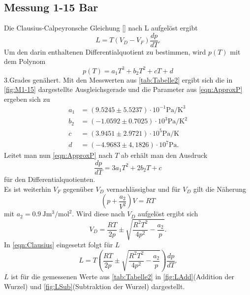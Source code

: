 \subsection{Messung 1-15 Bar}
Die Clausius-Calpeyronsche Gleichung \eqref{} nach L aufgelöst ergibt
\begin{equation}
  \label{eqn:Clausius}
  L = T\left(V_D - V_F\right)\frac{dp}{dT}.
\end{equation}
Um den darin enthaltenen Differentialquotient zu bestimmen, wird $p(T)$ mit dem Polynom
\begin{equation}
  \label{eqn:ApproxP}
  p\left(T\right) = a_1T^3 + b_2T^2 + cT + d
\end{equation}
3.Grades genähert. Mit den Messwerten aus \autoref{tab:Tabelle2} ergibt sich die in \autoref{fig:M1-15} dargestellte Ausgleichsgerade
und die Parameter aus \eqref{eqn:ApproxP} ergeben sich zu
\begin{align*}
  a_1 &= (9.5245\pm 5.5237)\cdot 10^{-1}\unit{\pascal\per\cubic\kelvin} \\
  b_2 &= (-1.0592\pm 0.7025)\cdot 10^3\unit{\pascal\per\kelvin\squared} \\
  c &= (3.9451\pm 2.9721)\cdot 10^5\unit{\pascal\per\kelvin} \\
  d &= (-4.9683\pm 4,1826)\cdot 10^7\unit{\pascal}.
\end{align*}
Leitet man nun \eqref{eqn:ApproxP} nach $T$ ab erhält man den Ausdruck
\begin{equation}
  \frac{dp}{dT} = 3a_1T^2 + 2b_2T + c
\end{equation}
für den Differentialquotienten.\\
Es ist weiterhin $V_F$ gegenüber $V_D$ vernachlässigbar und für $V_D$ gilt die Näherung
\begin{equation}
  \left(p + \frac{a_2}{V^2}\right)V = RT
\end{equation}
mit $a_2 = \SI{0,9}{\joule\cubic\meter\per\mol\squared}$. Wird diese nach $V_D$ aufgelöst ergibt sich
\begin{equation}
  V_D = \frac{RT}{2p}\pm\sqrt{\frac{R^2T^2}{4p^2}-\frac{a_2}{p}}.
\end{equation}
In \eqref{eqn:Clausius} eingesetzt folgt für $L$
\begin{equation}
  \label{eqn:LT}
  L = T\left(\frac{RT}{2p}\pm\sqrt{\frac{R^2T^2}{4p^2}-\frac{a_2}{p}}\right)\frac{dp}{dT}.
\end{equation}
$L$ ist für die gemessenen Werte aus \autoref{tab:Tabelle2} in \autoref{fig:LAdd}(Addition der Wurzel) und \autoref{fig:LSub}(Subtraktion der Wurzel) dargestellt.
